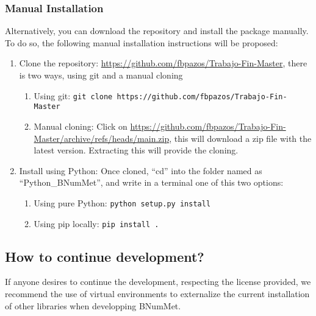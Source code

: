 \subsubsection*{Manual Installation}
Alternatively, you can download the repository and install the package manually. To do so, the following manual installation instructions will be proposed:
\begin{enumerate}
    \item Clone the repository: \href{https://github.com/fbpazos/Trabajo-Fin-Master}{https://github.com/fbpazos/Trabajo-Fin-Master}, there is two ways, using git and a manual cloning
    \begin{enumerate}
        \item Using git: \lstinline|git clone https://github.com/fbpazos/Trabajo-Fin-Master|
        
        \item Manual cloning: Click on \href{https://github.com/fbpazos/Trabajo-Fin-Master/archive/refs/heads/main.zip}{https://github.com/fbpazos/Trabajo-Fin-Master/archive/refs/heads/main.zip}, this will download a zip file with the latest version. Extracting this will provide the cloning.
    \end{enumerate}

    \item Install using Python: Once cloned, ``cd'' into the folder named as ``Python\_BNumMet'', and write in a terminal one of this two options:
    \begin{enumerate}
        \item Using pure Python: \lstinline|python setup.py install|
        \item Using pip locally: \lstinline|pip install .|
    \end{enumerate}
    
\end{enumerate}


\subsection*{How to continue development?}
If anyone desires to continue the development, respecting the license provided, we recommend the use of virtual environments to externalize the current installation of other libraries when developping BNumMet. 


